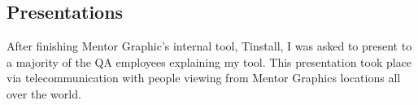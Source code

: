 \documentclass[letterpaper,10pt,notitlepage,fleqn]{article}
\begin{document}
\subsection{Presentations}
\indent After finishing Mentor Graphic's internal tool, Tinstall, I was asked to present to 
a majority of the QA employees explaining my tool. This presentation took place via 
telecommunication with people viewing from Mentor Graphics locations all over the 
world.
\end{document}
